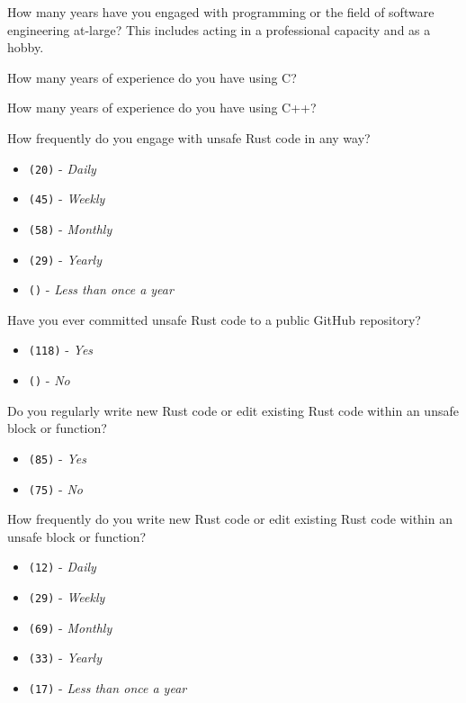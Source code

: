 \begin{protocol}
\item \label{survey:bq1}  How many years have you engaged with programming or the field of software engineering at-large? This includes acting in a professional capacity and as a hobby.

\item \label{survey:bq2}  How many years of experience do you have using C?

\item \label{survey:bq3}  How many years of experience do you have using C++?

\item \label{survey:bq4}  How frequently do you engage with unsafe Rust code in any way?
\begin{itemize}
\item \texttt{(20)} - \textit{Daily}
\item \texttt{(45)} - \textit{Weekly}
\item \texttt{(58)} - \textit{Monthly}
\item \texttt{(29)} - \textit{Yearly}
\item \texttt{()} - \textit{Less than once a year}
\end{itemize}
\item \label{survey:bq5}  Have you ever committed unsafe Rust code to a public GitHub repository?
\begin{itemize}
\item \texttt{(118)} - \textit{Yes}
\item \texttt{()} - \textit{No}
\end{itemize}
\item \label{survey:bq6}  Do you regularly write new Rust code or edit existing Rust code within an unsafe block or function?
\begin{itemize}
\item \texttt{(85)} - \textit{Yes}
\item \texttt{(75)} - \textit{No}
\end{itemize}
\item \label{survey:bq7}  How frequently do you write new Rust code or edit existing Rust code within an unsafe block or function?
\begin{itemize}
\item \texttt{(12)} - \textit{Daily}
\item \texttt{(29)} - \textit{Weekly}
\item \texttt{(69)} - \textit{Monthly}
\item \texttt{(33)} - \textit{Yearly}
\item \texttt{(17)} - \textit{Less than once a year}
\end{itemize}
\end{protocol}

